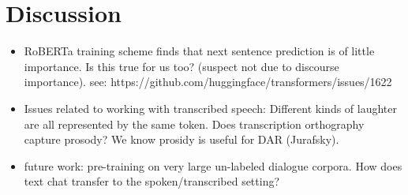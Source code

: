 \documentclass[11pt,a4paper]{article}
\begin{document}
\section{Discussion} %
\begin{itemize}
  \item RoBERTa training scheme finds that next sentence prediction is of little importance. Is this true for us too? (suspect not due to discourse importance). see: https://github.com/huggingface/transformers/issues/1622
  \item Issues related to working with transcribed speech: Different kinds of laughter are all represented by the same token. Does transcription orthography capture prosody? We know prosidy is useful for DAR (Jurafsky).
  \item future work: pre-training on very large un-labeled dialogue corpora. How does text chat transfer to the spoken/transcribed setting?
\end{itemize}



\end{document}

